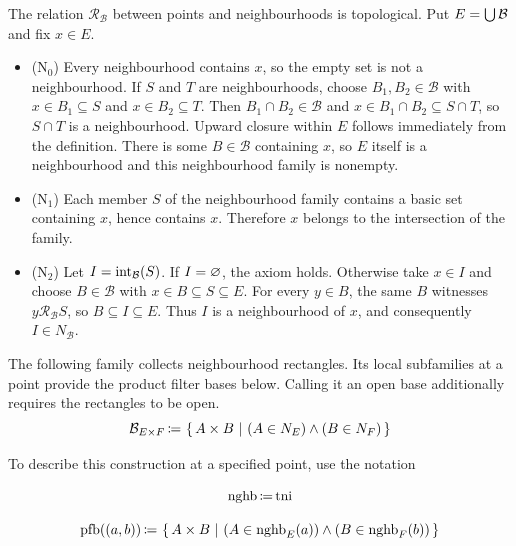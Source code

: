 \begin{theorem}
The relation $\mathcal{R}_\mathcal{B}$ between points and neighbourhoods is topological.
\ProofNoPar
Put $E=\bigcup\mathcal{B}$ and fix $x\in E$.
\begin{itemize}
\item (N$_0$) Every neighbourhood contains $x$, so the empty set is not
a neighbourhood. If $S$ and $T$ are neighbourhoods, choose
$B_1,B_2\in\mathcal{B}$ with $x\in B_1\subseteq S$ and
$x\in B_2\subseteq T$. Then $B_1\cap B_2\in\mathcal{B}$ and
$x\in B_1\cap B_2\subseteq S\cap T$, so $S\cap T$ is a neighbourhood.
Upward closure within $E$ follows immediately from the definition.
There is some $B\in\mathcal{B}$ containing $x$, so $E$ itself is a
neighbourhood and this neighbourhood family is nonempty.
\item (N$_1$) Each member $S$ of the neighbourhood family contains a
basic set containing $x$, hence contains $x$. Therefore $x$ belongs
to the intersection of the family.
\item (N$_2$) Let $I=\mathrm{int}_\mathcal{B}(S)$. If $I=\varnothing$,
the axiom holds. Otherwise take $x\in I$ and choose
$B\in\mathcal{B}$ with $x\in B\subseteq S\subseteq E$.
For every $y\in B$, the same $B$ witnesses $y\mathcal{R}_\mathcal{B}S$,
so $B\subseteq I\subseteq E$. Thus $I$ is a neighbourhood of $x$,
and consequently $I\in N_\mathcal{B}$.
\end{itemize}
\DoneNoPar
\end{theorem}
\begin{definition}
The following family collects neighbourhood rectangles. Its local
subfamilies at a point provide the product filter bases below. Calling
it an open base additionally requires the rectangles to be open.
\[
\mathcal{B}_{E\times F} \,{\coloneqq}\, \left\{\,A\times B\ \middle|\ (A\in N_E) \land (B\in N_F)\,\right\}
\]
\end{definition}
To describe this construction at a specified point, use the notation
\begin{notation}
\[
\mathrm{nghb} \,{\coloneqq}\, \mathrm{tni}
\]
\end{notation}
\begin{definition}
\[
\mathrm{pfb}((a,b))\,{\coloneqq}\, \left\{\,A\times B \ \middle|\  (A\in \mathrm{nghb}_E(a)) \land (B\in \mathrm{nghb}_F(b))\,\right\}
\]
\end{definition}
\pagebreak
